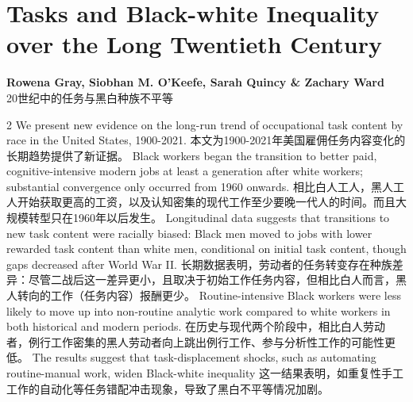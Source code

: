 \documentclass[cn,hazy,blue,14pt,screen]{elegantnote}
\begin{document}
\section{Tasks and Black-white Inequality over the Long Twentieth Century}
\begin{center}
	\textbf{Rowena Gray, Siobhan M. O'Keefe, Sarah Quincy \& Zachary Ward}\\
	20世纪中的任务与黑白种族不平等
\end{center}
\begin{paracol}{2}
	We present new evidence on the long-run trend of occupational task content by race in the United States, 1900-2021. 
	\switchcolumn
	本文为1900-2021年美国雇佣任务内容变化的长期趋势提供了新证据。
	\switchcolumn*
	Black workers began the transition to better paid, cognitive-intensive modern jobs at least a generation after white workers; substantial convergence only occurred from 1960 onwards. 
	\switchcolumn
	相比白人工人，黑人工人开始获取更高的工资，以及认知密集的现代工作至少要晚一代人的时间。而且大规模转型只在1960年以后发生。
	\switchcolumn*
	Longitudinal data suggests that transitions to new task content were racially biased: Black men moved to jobs with lower rewarded task content than white men, conditional on initial task content, though gaps decreased after World War II. 
	\switchcolumn
	长期数据表明，劳动者的任务转变存在种族差异：尽管二战后这一差异更小，且取决于初始工作任务内容，但相比白人而言，黑人转向的工作（任务内容）报酬更少。
	\switchcolumn*
	Routine-intensive Black workers were less likely to move up into non-routine analytic work compared to white workers in both historical and modern periods. 
		\switchcolumn
	在历史与现代两个阶段中，相比白人劳动者，例行工作密集的黑人劳动者向上跳出例行工作、参与分析性工作的可能性更低。
	\switchcolumn*
	The results suggest that task-displacement shocks, such as automating routine-manual work, widen Black-white inequality
	\switchcolumn
	这一结果表明，如重复性手工工作的自动化等任务错配冲击现象，导致了黑白不平等情况加剧。
	
\end{paracol}
\end{document}

